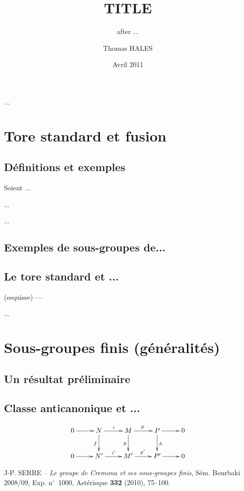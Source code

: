 \documentclass[brochure,english,12pt]{bourbaki}%
\date{Avril 2011}
\title{TITLE}
\subtitle{after ...}
\author{Thomas HALES}
\begin{document}
\maketitle


\bigskip
...


\section{Tore standard et fusion}
\subsection{D\'efinitions et exemples}
Soient ...
\begin{prop}
\label{exposants}
...
\end{prop}

\begin{rema} ... \end{rema}

\subsection{Exemples de sous-groupes de...}

\subsection{Le tore standard et ...}

\begin{theo} [\cite{Se}]
\label{cascade}
\end{theo}

 (esquisse) --- 
\begin{defi}...
\end{defi}


\section{Sous-groupes finis (g\'en\'eralit\'es)}

\subsection{Un r\'esultat pr\'eliminaire}

\subsection{Classe anticanonique et ...}

\[
\xymatrix{
       0 \ar[r] & N \ar[r]^{i} \ar[d]_f & M \ar[r]^{p} \ar[d]_g &
                  P \ar[r] \ar[d]^h  & 0 \\
       0 \ar[r] & N' \ar[r]^{i'} & M' \ar[r]^{p'} & P' \ar[r]  & 0 }
\]


\begin{thebibliography}{666}

 J-P. SERRE -- {\it Le groupe de Cremona et ses sous-groupes finis},
S\'em. Bourbaki 2008/09, Exp. n$^\circ$~1000, Ast\'erisque {\bf 332} (2010), 75--100.

\end{thebibliography}
\end{document}
